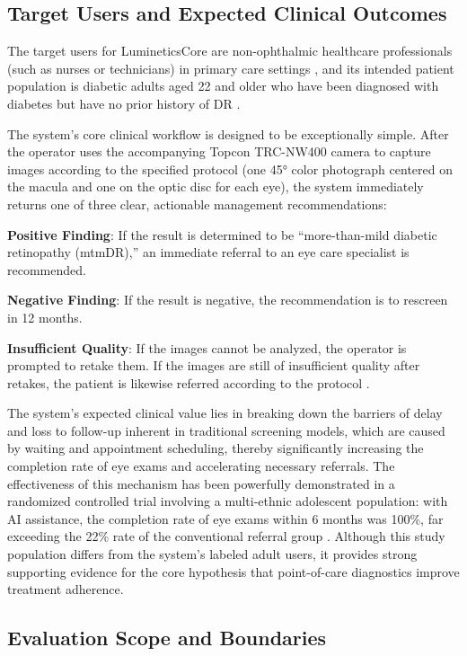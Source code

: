 \documentclass[sigplan,screen]{acmart}
\begin{document}
\subsection{Target Users and Expected Clinical Outcomes}

The target users for LumineticsCore are non-ophthalmic healthcare professionals (such as nurses or technicians) in primary care settings \cite{digitaldiagnostics2024indications}, and its intended patient population is diabetic adults aged 22 and older who have been diagnosed with diabetes but have no prior history of DR \cite{fda2018denovo_summary}.

The system's core clinical workflow is designed to be exceptionally simple. After the operator uses the accompanying Topcon TRC-NW400 camera to capture images according to the specified protocol (one 45° color photograph centered on the macula and one on the optic disc for each eye), the system immediately returns one of three clear, actionable management recommendations:

\textbf{Positive Finding}: If the result is determined to be ``more-than-mild diabetic retinopathy (mtmDR),'' an immediate referral to an eye care specialist is recommended.

\textbf{Negative Finding}: If the result is negative, the recommendation is to rescreen in 12 months.

\textbf{Insufficient Quality}: If the images cannot be analyzed, the operator is prompted to retake them. If the images are still of insufficient quality after retakes, the patient is likewise referred according to the protocol \cite{fda2018denovo_summary}.

The system's expected clinical value lies in breaking down the barriers of delay and loss to follow-up inherent in traditional screening models, which are caused by waiting and appointment scheduling, thereby significantly increasing the completion rate of eye exams and accelerating necessary referrals. The effectiveness of this mechanism has been powerfully demonstrated in a randomized controlled trial involving a multi-ethnic adolescent population: with AI assistance, the completion rate of eye exams within 6 months was 100\%, far exceeding the 22\% rate of the conventional referral group \cite{wolf2024autonomous}. Although this study population differs from the system's labeled adult users, it provides strong supporting evidence for the core hypothesis that point-of-care diagnostics improve treatment adherence.

\subsection{Evaluation Scope and Boundaries}
\end{document}
